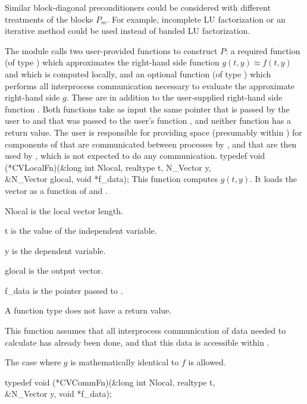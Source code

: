 Similar block-diagonal preconditioners could be considered with different
treatments of the blocks $P_m$. For example, incomplete LU factorization or
an iterative method could be used instead of banded LU factorization.

The {\cvbbdpre} module calls two user-provided functions to construct $P$: 
a required function  (of type ) which approximates
the right-hand side function $g(t,y) \approx f(t,y)$ and which is computed locally,
and an optional function  (of type ) which performs 
all interprocess communication necessary to evaluate the approximate right-hand
side $g$.  These are in addition to the user-supplied right-hand side function
.  Both functions take as input the same pointer  that is passed
by the user to  and that was passed to the user's function ,
and neither function has a return value. The user is responsible for
providing space (presumably within ) for components of 
that are communicated between processes by , and that are
then used by , which is not expected to do any communication.
{
  typedef void (*CVLocalFn)(&long int Nlocal, realtype t, N\_Vector y, \\
                            &N\_Vector glocal, void *f\_data);
}
{
  This function computes $g(t,y)$. It loads the vector
   as a function of  and .  
}
{
  \begin{args}[Nlocal]
  \item[Nlocal] 
    is the local vector length.
  \item[t]
    is the value of the independent variable.
  \item[y]
    is the dependent variable. 
  \item[glocal]
    is the output vector.
  \item[f\_data]
    is the       
    pointer passed to .  
  \end{args}
}
{
  A  function type does not have a return value.
}
{
  This function assumes that all interprocess communication of data needed to 
  calculate  has already been done, and that this data is accessible within
  .

  The case where $g$ is mathematically identical to $f$ is allowed.
}
{
  typedef void (*CVCommFn)(&long int Nlocal, realtype t,  \\
                           &N\_Vector y, void *f\_data);
}
